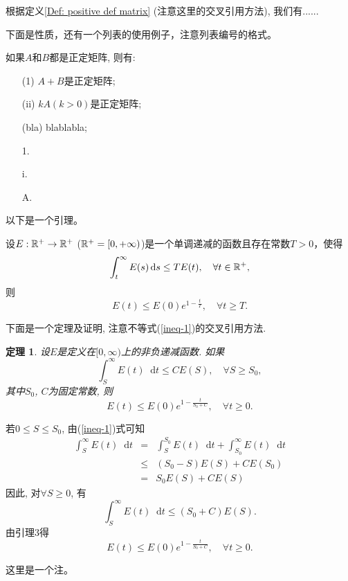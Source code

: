 \documentclass[UTF8,oneside,12pt]{article}  %
\makeatletter
\theoremstyle{DingLi1}
\numberwithin{equation}{section}
\newtheorem{theorem}{\hspace{2em}定理}[section]
\newtheorem{lemma}{\hskip 2em 引理}[section]
\newtheorem{remark}{\hskip 2em 注}[section]
\newtheorem{property}{\hskip 2em 性质}[section]
\theoremstyle{DingLi2}
\renewenvironment{proof}[1][\proofname]{\par%
\pushQED{\qed}%
\normalfont \topsep6\p@\@plus6\p@\relax%
\trivlist%
\item[\hskip\labelsep%
#1]\ignorespaces%
}{%
\popQED\endtrivlist\@endpefalse%
}
\renewcommand{\proofname}{\heiti{证明}}%
\def\d{\mathop{}\!\mathrm{d}} %
\makeatother
\begin{document}
根据定义\ref{Def: positive def matrix} (注意这里的交叉引用方法), 我们有......

下面是性质，还有一个列表的使用例子，注意列表编号的格式。
\begin{property}\label{Property: positive matrix}
如果$A$和$B$都是正定矩阵, 则有:
\begin{itemize}
  \item[(1)]$A+B$是正定矩阵;
  \item[(ii)]$kA$$(k>0)$是正定矩阵;
  \item[(bla)]blablabla;
  \item[1.]
  \item[i.]
  \item[A.]
\end{itemize}
\end{property}

以下是一个引理。
\begin{lemma}
设$E:\Bbb{R}^+ \to \Bbb{R}^+$ ($\Bbb{R}^+=[0,+\infty)$)是一个单调递减的函数且存在常数$T>0$，使得
$$\int_t^{\infty} E(s) \d s \leq TE(t),\quad \forall t\in \Bbb{R}^+,$$
则
$$E(t)\leq E(0) e^{1- \frac{t}{T}},\quad \forall t\geq T. $$
\end{lemma}

下面是一个定理及证明, 注意不等式(\ref{ineq-1})的交叉引用方法.
\begin{theorem}
设$E$是定义在$[0,\infty)$上的非负递减函数. 如果
\begin{equation}\label{ineq-1}  %
\int_S^{\infty} E(t) \d t \leq CE(S),\quad \forall S\geq S_0,
\end{equation}
其中$S_0$, $C$为固定常数, 则
$$E(t)\leq E(0)e^{1-\frac{t}{S_0+C}},\quad \forall t\geq 0.$$
\end{theorem}

\begin{proof}
若$0\leq S\leq S_0$, 由(\ref{ineq-1})式可知
\begin{eqnarray*}
  \int_S^{\infty} E(t)\d t &=& \int_S^{S_0} E(t)\d t +\int_{S_0}^{\infty} E(t)\d t\\
  &\leq &(S_0-S) E(S)+CE(S_0)\\
 &= &S_0 E(S) +CE(S)
\end{eqnarray*}
因此, 对$\forall S\geq 0$, 有
$$\int_S^{\infty} E(t) \d t \leq  (S_0+C)E(S).$$
由引理3得
$$E(t)\leq E(0)e^{1-\frac{t}{S_0+C}},\quad \forall t\geq 0.$$
\end{proof}
\begin{remark}
这里是一个注。
\end{remark}
\end{document}
